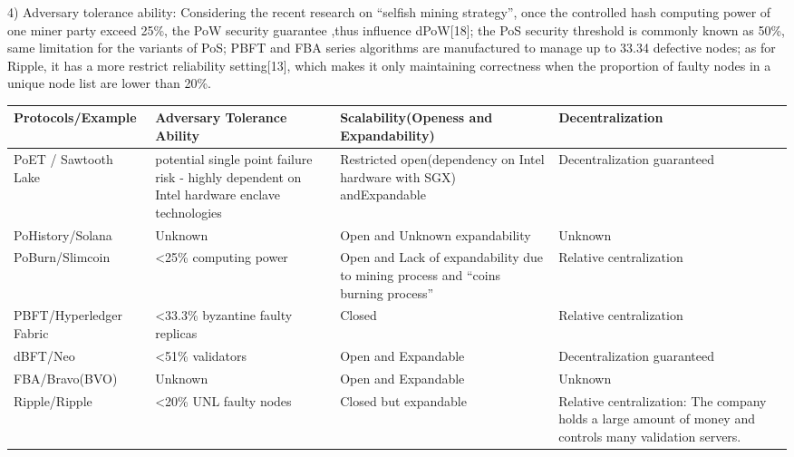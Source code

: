 \documentclass[doublespacing]{bmcart}
\begin{document}
\begin{CJK*}{UTF8}{gbsn}
4) Adversary tolerance ability:
Considering the recent research on ``selfish mining strategy'', once the controlled hash computing power of one miner party exceed 25\%, the PoW security guarantee ,thus influence dPoW[18]; the PoS security threshold is commonly known as 50\%, same limitation for the variants of PoS; PBFT and FBA series algorithms are manufactured to manage up to 33.34 defective nodes; as for Ripple, it has a more restrict reliability setting[13], which makes it only maintaining correctness when the
proportion of faulty nodes in a unique node list are
lower than 20\%.
  

  \begin{tabular}{p{2cm}p{3cm}p{3cm}p{3cm}}
  \hline
 Protocols/E\-xample  & 
Adversary Tolerance Ability & 
Scalability(Openess and Expandability) & Decentralization \\ \hline
PoET / Sawtooth Lake 
 & potential single point failure risk - highly dependent on Intel hardware enclave technologies  
 & Restricted open(dependency on Intel hardware with SGX) and\newline Expandable 
 & Decentralization guaranteed\\ \hline
 
PoHistory/So\-lana 
& Unknown 
& Open and \newline Unknown expandability 
& Unknown \\ \hline

PoBurn/\newline Slimcoin 
& \textless25\% computing power 
& Open and \newline Lack of expandability due to mining process and ``coins burning process'' 
& Relative centralization \\ \hline

PBFT/Hyp\-erledger Fabric
& \textless33.3\% byzantine faulty replicas 
& Closed 
& Relative centralization \\ \hline

dBFT/Neo 
& \textless51\% validators 
& Open and Expandable 
& Decentralization guaranteed \\ \hline

FBA/Bravo\newline(BVO) 
& Unknown 
& Open and Expandable 
& Unknown  \\ \hline

Ripple/Ripple 
& \textless20\% UNL faulty nodes 
& Closed but expandable
& Relative centralization: The company holds a large amount of money and controls many validation servers.\\ \hline


\end{tabular}
\end{CJK*}
\end{document}
